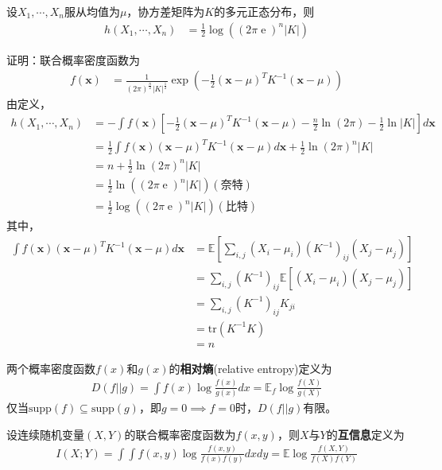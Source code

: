 \documentclass{ctexbook}
\DeclareMathOperator{\e}{e}
\begin{document}
\begin{example}[多元正态分布的熵]
    设$X_1,\cdots,X_n$服从均值为$\mu$，协方差矩阵为$K$的多元正态分布，则\begin{align*}
        h(X_1,\cdots,X_n)&=\frac{1}{2}\log((2\pi \e)^n|K|)
    \end{align*}

    证明：联合概率密度函数为\begin{align*}
        f(\mathbf{x})&=\frac{1}{(2\pi)^{\frac{n}{2}}|K|^{\frac{1}{2}}}\exp\left(-\frac{1}{2}(\mathbf{x}-\mu)^T K^{-1}(\mathbf{x}-\mu)\right)
    \end{align*}
    由定义，\begin{align*}
        h(X_1,\cdots,X_n)&=-\int f(\mathbf{x})\left[-\frac{1}{2}(\mathbf{x}-\mu)^T K^{-1}(\mathbf{x}-\mu)-\frac{n}{2}\ln(2\pi)-\frac{1}{2}\ln|K|\right]d\mathbf{x}\\
        &=\frac{1}{2}\int f(\mathbf{x})(\mathbf{x}-\mu)^T K^{-1}(\mathbf{x}-\mu)d\mathbf{x}+\frac{1}{2}\ln (2\pi)^n |K|\\
        &=n+\frac{1}{2}\ln (2\pi)^n |K|\\
        &=\frac{1}{2}\ln((2\pi \e)^n|K|)(\text{奈特})\\
        &=\frac{1}{2}\log((2\pi \e)^n|K|)(\text{比特})
    \end{align*}
    其中，\begin{align*}
        \int f(\mathbf{x})(\mathbf{x}-\mu)^T K^{-1}(\mathbf{x}-\mu)d\mathbf{x}&=\mathbb{E}\left[\sum_{i,j} (X_i-\mu_i)(K^{-1})_{ij}(X_j-\mu_j)\right]\\
        &=\sum_{i,j} (K^{-1})_{ij} \mathbb{E}[(X_i-\mu_i)(X_j-\mu_j)]\\
        &=\sum_{i,j} (K^{-1})_{ij} K_{ji}\\
        &=\text{tr}(K^{-1}K)\\
        &=n
    \end{align*}
\end{example}

\begin{definition}[相对熵]
    两个概率密度函数$f(x)$和$g(x)$的\textbf{相对熵}(relative entropy)定义为
\begin{align*}
    D(f||g)=\int f(x)\log \frac{f(x)}{g(x)}dx=\mathbb{E}_f \log \frac{f(X)}{g(X)}
\end{align*}
    仅当$\text{supp}(f)\subseteq \text{supp}(g)$，即$g=0\implies f=0$时，$D(f||g)$有限。
\end{definition}

\begin{definition}[互信息]
    设连续随机变量$(X,Y)$的联合概率密度函数为$f(x,y)$，则$X$与$Y$的\textbf{互信息}定义为
    \begin{align*}
        I(X;Y)=\int\int f(x,y)\log \frac{f(x,y)}{f(x)f(y)}dxdy=\mathbb{E} \log \frac{f(X,Y)}{f(X)f(Y)}
    \end{align*}
\end{definition}
\end{document}
